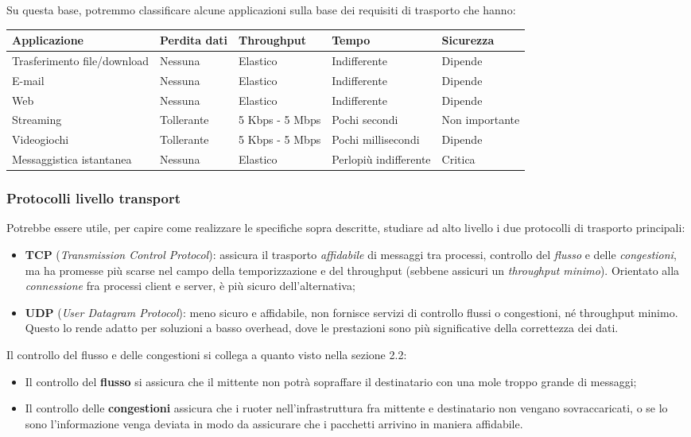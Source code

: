 \documentclass[a4paper,11pt]{article}
\begin{document}
Su questa base, potremmo classificare alcune applicazioni sulla base dei requisiti di trasporto che hanno:
\begin{table}[H]
	\center {}
	\begin{tabular} { p{3cm} || p{2.5cm} | p{2.5cm} | p{2.5cm} | p{2.5cm} }
		\bfseries Applicazione & \bfseries Perdita dati & \bfseries Throughput & \bfseries Tempo & \bfseries Sicurezza \\ 
		\hline
		Trasferimento file/download & Nessuna & Elastico & Indifferente & Dipende \\
		E-mail & Nessuna & Elastico & Indifferente & Dipende \\ 
		Web & Nessuna & Elastico & Indifferente & Dipende \\ 
		Streaming & Tollerante & 5 Kbps - 5 Mbps & Pochi secondi & Non importante \\ 
		Videogiochi & Tollerante & 5 Kbps - 5 Mbps & Pochi millisecondi & Dipende \\ 
		Messaggistica istantanea & Nessuna & Elastico & Perlopiù indifferente & Critica \\ 
	\end{tabular}
\end{table}

\subsubsection{Protocolli livello transport}
Potrebbe essere utile, per capire come realizzare le specifiche sopra descritte, studiare ad alto livello i due protocolli di trasporto principali:
\begin{itemize}
	\item \textbf{TCP} (\textit{Transmission Control Protocol}): assicura il trasporto \textit{affidabile} di messaggi tra processi, controllo del \textit{flusso} e delle \textit{congestioni}, ma ha promesse più scarse nel campo della temporizzazione e del throughput (sebbene assicuri un \textit{throughput minimo}).
		Orientato alla \textit{connessione} fra processi client e server, è più sicuro dell'alternativa;
	\item \textbf{UDP} (\textit{User Datagram Protocol}): meno sicuro e affidabile, non fornisce servizi di controllo flussi o congestioni, né throughput minimo. Questo lo rende adatto per soluzioni a basso overhead, dove le prestazioni sono più significative della correttezza dei dati.
\end{itemize}

Il controllo del flusso e delle congestioni si collega a quanto visto nella sezione 2.2:
\begin{itemize}
	\item Il controllo del \textbf{flusso} si assicura che il mittente non potrà sopraffare il destinatario con una mole troppo grande di messaggi;
	\item Il controllo delle \textbf{congestioni} assicura che i ruoter nell'infrastruttura fra mittente e destinatario non vengano sovraccaricati, o se lo sono l'informazione venga deviata in modo da assicurare che i pacchetti arrivino in maniera affidabile. 
\end{itemize}
\end{document}
